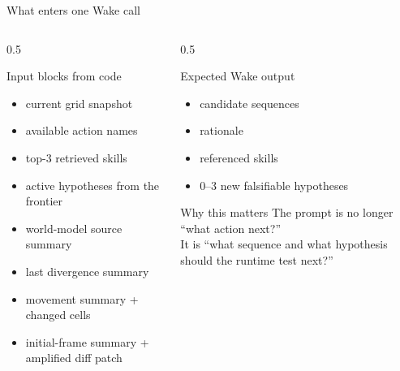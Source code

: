 \documentclass[aspectratio=169]{beamer}
\begin{document}
\begin{frame}{What enters one Wake call}
\small
\begin{columns}[T,totalwidth=\textwidth]
\begin{column}{0.5\textwidth}
\begin{block}{Input blocks from code}
\begin{itemize}
\item current grid snapshot
\item available action names
\item top-3 retrieved skills
\item active hypotheses from the frontier
\item world-model source summary
\item last divergence summary
\item movement summary + changed cells
\item initial-frame summary + amplified diff patch
\end{itemize}
\end{block}
\end{column}
\begin{column}{0.5\textwidth}
\begin{block}{Expected Wake output}
\begin{itemize}
\item candidate sequences
\item rationale
\item referenced skills
\item 0--3 new falsifiable hypotheses
\end{itemize}
\end{block}
\vspace{0.4em}
\begin{block}{Why this matters}
The prompt is no longer ``what action next?''\\
It is ``what sequence and what hypothesis should the runtime test next?''
\end{block}
\end{column}
\end{columns}
\end{frame}
\end{document}
